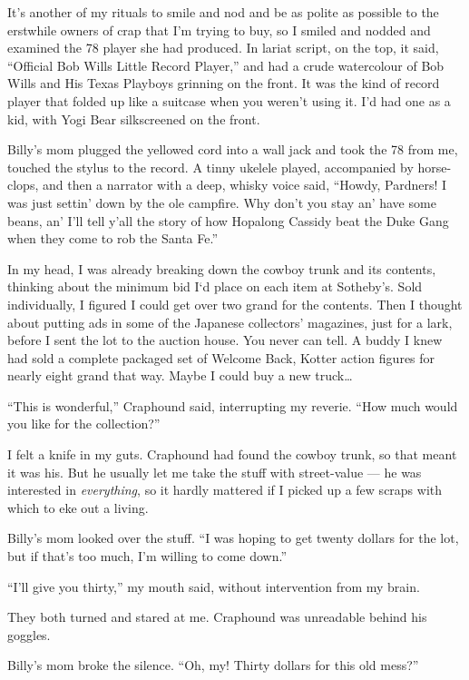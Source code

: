 It's another of my rituals to smile and nod and be as polite as
possible to the erstwhile owners of crap that I'm trying to buy, so
I smiled and nodded and examined the 78 player she had produced. In
lariat script, on the top, it said,
``Official Bob Wills Little Record Player,'' and had a crude
watercolour of Bob Wills and His Texas Playboys grinning on the
front. It was the kind of record player that folded up like a
suitcase when you weren't using it. I'd had one as a kid, with Yogi
Bear silkscreened on the front.

Billy's mom plugged the yellowed cord into a wall jack and took the
78 from me, touched the stylus to the record. A tinny ukelele
played, accompanied by horse-clops, and then a narrator with a
deep, whisky voice said,
``Howdy, Pardners! I was just settin' down by the ole campfire. Why 
don't you stay an' have some beans, an' I'll tell y'all the story of 
how Hopalong Cassidy beat the Duke Gang when they come to rob the Santa Fe.''

In my head, I was already breaking down the cowboy trunk and its
contents, thinking about the minimum bid
I`d place on each item at Sotheby's. Sold individually, I figured I could 
get over two grand for the contents. Then I thought about putting ads in 
some of the Japanese collectors'
magazines, just for a lark, before I sent the lot to the auction
house. You never can tell. A buddy I knew had sold a complete
packaged set of Welcome Back, Kotter action figures for nearly
eight grand that way. Maybe I could buy a new truck\ldots{}

``This is wonderful,'' Craphound said, interrupting my reverie.
``How much would you like for the collection?''

I felt a knife in my guts. Craphound had found the cowboy trunk, so
that meant it was his. But he usually let me take the stuff with
street-value --- he was interested in \emph{everything}, so it
hardly mattered if I picked up a few scraps with which to eke out a
living.

Billy's mom looked over the stuff.
``I was hoping to get twenty dollars for the lot, but if that's too much, 
I'm willing to come down.''

``I'll give you thirty,'' my mouth said, without intervention from
my brain.

They both turned and stared at me. Craphound was unreadable behind
his goggles.

Billy's mom broke the silence.
``Oh, my! Thirty dollars for this old mess?''

